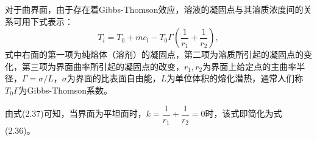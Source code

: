 \begin{enumerate}[(1)]
\qquad 对于曲界面，由于存在着Gibbs-Thomson效应，溶液的凝固点与其溶质浓度间的关系可用下式表示：
\begin{equation}
T_i=T_0+mc_l-T_0\Gamma(\frac{1}{r_1}+\frac{1}{r_2}),
\end{equation}
式中右面的第一项为纯熔体（溶剂）的凝固点，第二项为溶质所引起的凝固点的变化，第三项为界面曲率所引起的凝固点的改变，$r_1,r_2$为界面上给定点的主曲率半径，$\Gamma=\sigma/L$，$\sigma$为界面的比表面自由能，$L$为单位体积的熔化潜热，通常人们称$T_0\Gamma$为Gibbs-Thomson系数。

\qquad 由式(2.37)可知，当界面为平坦面时，$k=\dfrac{1}{r_1}+\dfrac{1}{r_2}=0$时，该式即简化为式(2.36)。
\end{enumerate}